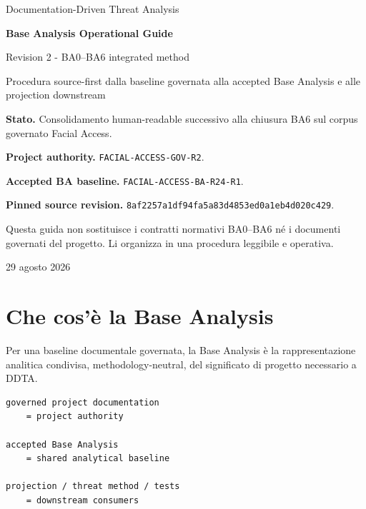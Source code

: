 \documentclass[11pt,a4paper]{article}
\newcommand{\code}[1]{\nolinkurl{#1}}
\begin{document}
\begin{titlepage}
\centering
\vspace*{1.5cm}
{\Large Documentation-Driven Threat Analysis\par}
\vspace{0.8cm}
{\Huge\bfseries Base Analysis Operational Guide\par}
\vspace{0.25cm}
{\LARGE Revision 2 - BA0--BA6 integrated method\par}
\vspace{0.9cm}
{\large Procedura source-first dalla baseline governata alla accepted Base Analysis e alle projection downstream\par}
\vfill
\begin{minipage}{0.88\textwidth}
\small
\textbf{Stato.} Consolidamento human-readable successivo alla chiusura BA6 sul corpus governato Facial Access.

\medskip
\textbf{Project authority.} \code{FACIAL-ACCESS-GOV-R2}.

\medskip
\textbf{Accepted BA baseline.} \code{FACIAL-ACCESS-BA-R24-R1}.

\medskip
\textbf{Pinned source revision.} \code{8af2257a1df94fa5a83d4853ed0a1eb4d020c429}.

\medskip
Questa guida non sostituisce i contratti normativi BA0--BA6 né i documenti governati del progetto. Li organizza in una procedura leggibile e operativa.
\end{minipage}
\vfill
{\large 29 agosto 2026\par}
\end{titlepage}

\tableofcontents
\newpage
{}

\section{Che cos'è la Base Analysis}

Per una baseline documentale governata, la Base Analysis è la rappresentazione analitica condivisa, methodology-neutral, del significato di progetto necessario a DDTA.

\begin{closedbox}
\begin{lstlisting}
governed project documentation
    = project authority

accepted Base Analysis
    = shared analytical baseline

projection / threat method / tests
    = downstream consumers
\end{lstlisting}
\end{closedbox}
\end{document}
